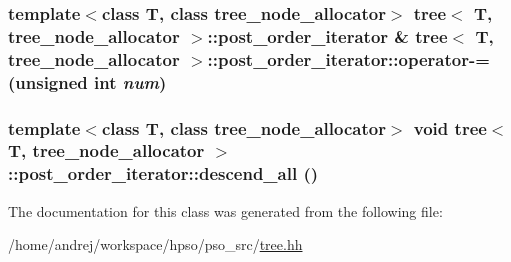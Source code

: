 \hypertarget{classtree_1_1post__order__iterator_93b7ddae75f30985a0d81f38bcbaa306}{
\subsubsection{\setlength{\rightskip}{0pt plus 5cm}template$<$class T, class tree\_\-node\_\-allocator$>$ {\bf tree}$<$ T, tree\_\-node\_\-allocator $>$::{\bf post\_\-order\_\-iterator} \& {\bf tree}$<$ T, tree\_\-node\_\-allocator $>$::post\_\-order\_\-iterator::operator-= (unsigned int {\em num})}}
\label{classtree_1_1post__order__iterator_93b7ddae75f30985a0d81f38bcbaa306}


\hypertarget{classtree_1_1post__order__iterator_ca4676b4986854521cfa2c7d84f62204}{
\subsubsection{\setlength{\rightskip}{0pt plus 5cm}template$<$class T, class tree\_\-node\_\-allocator$>$ void {\bf tree}$<$ T, tree\_\-node\_\-allocator $>$::post\_\-order\_\-iterator::descend\_\-all ()}}
\label{classtree_1_1post__order__iterator_ca4676b4986854521cfa2c7d84f62204}




The documentation for this class was generated from the following file:\begin{CompactItemize}
\item 
/home/andrej/workspace/hpso/pso\_\-src/\hyperlink{tree_8hh}{tree.hh}\end{CompactItemize}
